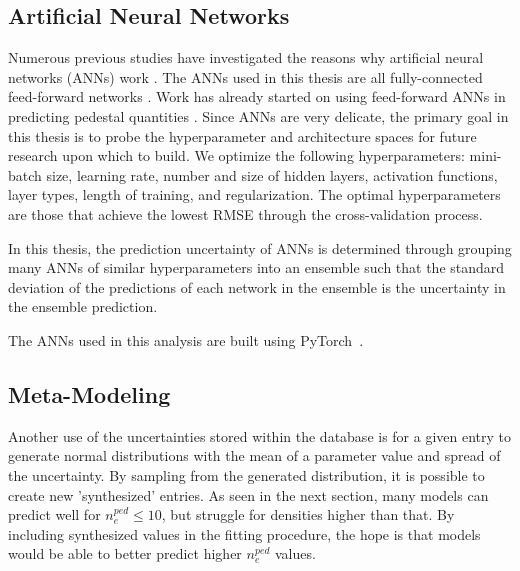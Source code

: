 \documentclass[a4paper, twoside, final, 12pt]{article}
\begin{document}
\subsection{Artificial Neural Networks}

Numerous previous studies have investigated the reasons why artificial neural networks (ANNs) work \cite{silver_mastering_2016, 7333916, CALTECH}.  The ANNs used in this thesis are all fully-connected feed-forward networks \cite{Goodfellow-et-al-2016, SCHMIDHUBER201585}. Work has already started on using feed-forward ANNs in predicting pedestal quantities \cite{Andreas}. 
Since ANNs are very delicate, the primary goal in this thesis is to probe the hyperparameter and architecture spaces for future research upon which to build. We optimize the following hyperparameters: mini-batch size, learning rate, number and size of hidden layers, activation functions, layer types, length of training, and regularization. The optimal hyperparameters are those that achieve the lowest RMSE through the cross-validation process.

In this thesis, the prediction uncertainty of ANNs is determined through grouping many ANNs of similar hyperparameters into an ensemble such that the standard deviation of the predictions of each network in the ensemble is the uncertainty in the ensemble prediction.

The ANNs used in this analysis are built using PyTorch~\cite{NEURIPS2019_9015}. 


\subsection{Meta-Modeling}
Another use of the uncertainties stored within the database is for a given entry to generate normal distributions with the mean of a parameter value and spread of the uncertainty. By sampling from the generated distribution, it is possible to create new 'synthesized' entries.
As seen in the next section, many models can predict well for $n_e^{ped} \leq 10$, but struggle for densities higher than that.
By including synthesized values in the fitting procedure, the hope is that models would be able to better predict higher $n_e^{ped}$ values.
\vspace{7cm}
\end{document}
